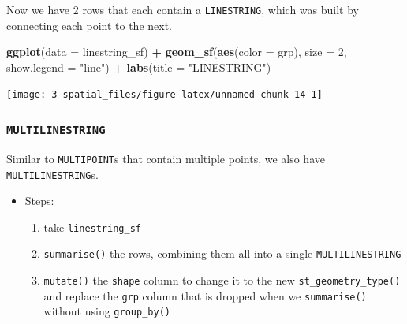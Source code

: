 \documentclass[
]{report}
\newenvironment{Shaded}{\begin{snugshade}}{\end{snugshade}}
\newcommand{\DataTypeTok}[1]{\textcolor[rgb]{0.13,0.29,0.53}{#1}}
\newcommand{\DecValTok}[1]{\textcolor[rgb]{0.00,0.00,0.81}{#1}}
\newcommand{\KeywordTok}[1]{\textcolor[rgb]{0.13,0.29,0.53}{\textbf{#1}}}
\newcommand{\NormalTok}[1]{#1}
\newcommand{\OperatorTok}[1]{\textcolor[rgb]{0.81,0.36,0.00}{\textbf{#1}}}
\newcommand{\StringTok}[1]{\textcolor[rgb]{0.31,0.60,0.02}{#1}}
\providecommand{\tightlist}{%
  \setlength{\itemsep}{0pt}\setlength{\parskip}{0pt}}
\begin{document}
Now we have 2 rows that each contain a \texttt{LINESTRING}, which was built by connecting each point to the next.

\begin{Shaded}
\begin{Highlighting}[]
\KeywordTok{ggplot}\NormalTok{(}\DataTypeTok{data =}\NormalTok{ linestring\_sf) }\OperatorTok{+}\StringTok{ }
\StringTok{  }\KeywordTok{geom\_sf}\NormalTok{(}\KeywordTok{aes}\NormalTok{(}\DataTypeTok{color =}\NormalTok{ grp), }\DataTypeTok{size =} \DecValTok{2}\NormalTok{, }\DataTypeTok{show.legend =} \StringTok{"line"}\NormalTok{) }\OperatorTok{+}
\StringTok{  }\KeywordTok{labs}\NormalTok{(}\DataTypeTok{title =} \StringTok{"LINESTRING"}\NormalTok{)}
\end{Highlighting}
\end{Shaded}

\begin{center}\texttt{[image: 3-spatial\_files/figure-latex/unnamed-chunk-14-1]} \end{center}

\hypertarget{multilinestring}{%
\subsubsection{\texorpdfstring{\texttt{MULTILINESTRING}}{MULTILINESTRING}}\label{multilinestring}}

Similar to \texttt{MULTIPOINT}s that contain multiple points, we also have \texttt{MULTILINESTRING}s.

\begin{itemize}
\tightlist
\item
  Steps:

  \begin{enumerate}
  \def\labelenumi{\arabic{enumi}.}
  \tightlist
  \item
    take \texttt{linestring\_sf}
  \item
    \texttt{summarise()} the rows, combining them all into a single \texttt{MULTILINESTRING}
  \item
    \texttt{mutate()} the \texttt{shape} column to change it to the new \texttt{st\_geometry\_type()} and replace the \texttt{grp} column that is dropped when we \texttt{summarise()} without using \texttt{group\_by()}
  \end{enumerate}
\end{itemize}
\end{document}

